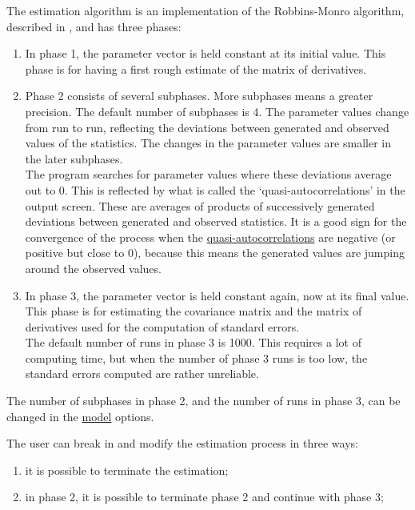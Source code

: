 \documentclass[a4paper,fleqn]{article}
\newcommand{\+}{\, + \,}
\begin{document}
{The estimation algorithm
is an implementation of the Robbins-Monro \citeyearpar{RobbinsMonro51}
 algorithm,
described in \citet{Snijders01, Snijders02}, and
has %
three phases:
\begin{enumerate}
\item In phase 1, the parameter vector is held constant at its
initial value.
      This phase is for
      having a first rough estimate of the matrix of derivatives.
\item Phase 2 consists of several subphases.
      More subphases means a greater precision. The default
      number of subphases is 4.
      The parameter values change from run to run, reflecting
      the deviations between generated and observed values of the
      statistics. The changes in the parameter values are smaller
      in the later subphases.\\
      The program searches for parameter values where these deviations
      average out to 0. This is reflected by what is called the
      \hypertarget{T_quasiac}{`quasi-auto\-cor\-relations'}
      in the output screen.
      These are averages
      of products of successively generated deviations between
      generated and observed statistics. It is a good sign
      for the convergence of the process when the
      \hyperlink{T_quasiac}{quasi-auto\-correlations}
      are negative (or positive but close to 0),
      because this means the generated values are jumping
      around the observed values.
\item In phase 3, the parameter vector is held constant again,
      now at its final value.
      This phase is for estimating the covariance matrix and the
      matrix of derivatives used for the computation of standard errors.\\
      The default number of runs in phase 3 is 1000. This requires a lot
      of computing time, but when the number of phase 3 runs is too low,
      the standard errors computed are rather unreliable.
\end{enumerate}

The number of subphases in phase 2, and the number of runs in
phase 3, can be changed in the \hyperlink{T_S_options}{model}
options.

\begin{screen}
\newpage
\end{screen}
The user can break in and modify the estimation process in three
ways:
\begin{enumerate}
\item it is possible to terminate the estimation;
\item in phase 2, it is possible to terminate phase 2
      and continue with phase 3;
\end{enumerate}

}
\end{document}
